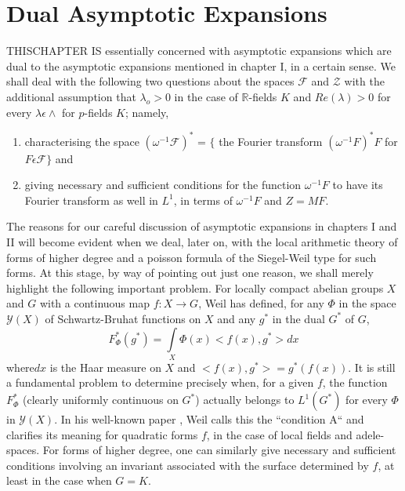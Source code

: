 
\chapter{Dual Asymptotic Expansions}\label{chap2} %

THIS\pageoriginale CHAPTER IS essentially concerned with asymptotic expansions
which are dual to the asymptotic expansions mentioned in chapter I,
in a certain sense. We shall deal with the following two questions
about the spaces $\mathscr{F}$ and $\mathscr{Z}$ with the additional
assumption that $\lambda_{o}>0$ in the case of $\mathbb{R}$-fields $K$
and $Re(\lambda)>0$ for every $\lambda \epsilon \wedge $ for $p$-fields
$K$; namely, 
\begin{enumerate}
\renewcommand{\theenumi}{\roman{enumi}}
\renewcommand{\labelenumi}{(\theenumi)}
\item characterising the space $(\omega^{-1}\mathscr{F})^{\ast}$
  = $\{$ the Fourier transform \break $(\omega^{-1}F)^{\ast}F$ for $F\epsilon
    \mathscr{F}\}$ and
\item giving necessary and sufficient conditions for the function
  $\omega^{-1}F$ to have its Fourier transform as well in $L^{1}$, in
  terms of $\omega^{-1}F$ and $Z=MF$.
\end{enumerate}
 The reasons for our careful discussion of asymptotic expansions in
 chapters I and II will become evident when we deal, later on, with
 the local arithmetic theory of forms of higher degree and a poisson
 formula of the Siegel-Weil type for such forms. At this stage, by way
 of pointing  out just one reason, we shall merely highlight the
 following important problem. For locally compact abelian groups
 $X$and $G$ with a continuous map $f:X\rightarrow G$, Weil has defined,
 for any $\Phi$ in the space $\mathscr{Y}(X)$ of Schwartz-Bruhat
 functions on $X$ and any $g^{\ast}$ in the dual $G^{\ast}$ of $G$, 
\begin{equation*}
  F_{\Phi}^{\ast}(g^{\ast})=\int\limits_{X}\Phi(x)<f(x), g^{\ast}>dx
\end{equation*}
 where\pageoriginale $dx$ is the Haar measure on $X$ and
 $<f(x),g^{\ast}>=g^{\ast}(f(x))$. It is still a fundamental problem
 to determine precisely when, for a given $f$, the function
 $F_{\Phi}^{\ast}$ (clearly uniformly continuous on $G^{\ast}$)
 actually belongs to $L^{1}(G^{\ast})$ for every $\Phi$ in
 $\mathscr{Y}(X)$. In his well-known paper \cite{Wei 5}, Weil calls this
 the ``condition A`` and clarifies its meaning for quadratic forms
 $f$, in the case of local fields and adele-spaces. For forms of
 higher degree, one can similarly give necessary and sufficient
 conditions involving an invariant associated with the surface
 determined by $f$, at least in the case when $G=K$.

